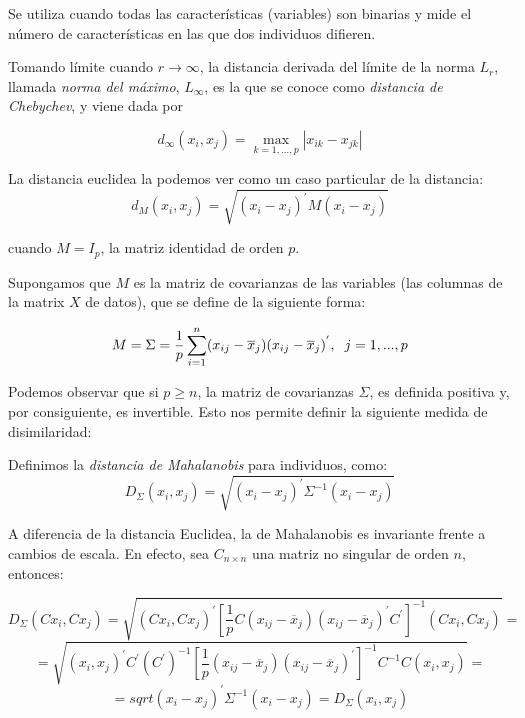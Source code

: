 Se utiliza cuando todas las características (variables) son binarias y mide el número de características en las que dos individuos difieren.

\begin{definicion}  %
    
    Tomando límite cuando $r \rightarrow \infty$, la distancia derivada del límite de la norma $L_{r}$, llamada \textit{norma del máximo}, $L_{\infty}$, es la que se conoce
    como \textit{distancia de Chebychev}, y viene dada por

    \[
    d_{\infty}(x_{i},x_{j}) = \max_{k=1,\dots,p} |x_{ik}-x_{jk}|
    \]
\end{definicion}

\begin{observacion}
    La distancia euclidea la podemos ver como un caso particular de la distancia:
    \[
    d_{M}(x_{i},x_{j}) = \sqrt{(x_{i}-x_{j})^{'}M(x_{i}-x_{j})}
    \]

    cuando $M=I_{p}$, la matriz identidad de orden $p$.
\end{observacion}

Supongamos que $M$ es la matriz de covarianzas de las variables (las columnas de la matrix $X$ de datos), que se define de la siguiente forma:

\[
M=\Sigma = \frac{1}{p} \sum_{i=1}^{n}(x_{ij}-\overline{x}_{j})(x_{ij}-\overline{x}_{j})^{'}, \hspace{0.2cm} j=1,...,p 
\]

Podemos observar que si $p \geq n$, la matriz de covarianzas $\Sigma$, es definida positiva y, por consiguiente, es invertible. Esto nos permite 
definir la siguiente medida de disimilaridad:

\begin{definicion}
    Definimos la \textit{distancia de Mahalanobis} para individuos, como:
    \[
    D_{\Sigma}(x_{i},x_{j}) = \sqrt{(x_{i}-x_{j})^{'}\Sigma^{-1}(x_{i}-x_{j})}
    \]
\end{definicion}

A diferencia de la distancia Euclidea, la de Mahalanobis es invariante frente a cambios de escala. En efecto, sea $C_{n\times n}$ una matriz no singular
de orden $n$, entonces:

\[
D_{\Sigma}(Cx_{i},Cx_{j}) = \sqrt{(Cx_{i},Cx_{j})^{'}[\frac{1}{p}C(x_{ij}-\overline{x}_{j})(x_{ij}-\overline{x}_{j})^{'}C^{'}]^{-1}(Cx_{i},Cx_{j})} = 
\]
\[
= \sqrt{(x_{i},x_{j})^{'}C^{'}(C^{'})^{-1}[\frac{1}{p}(x_{ij}-\overline{x}_{j})(x_{ij}-\overline{x}_{j})^{'}]^{-1}C^{-1}C(x_{i},x_{j})} = 
\]    
\[
= sqrt{(x_{i}-x_{j})^{'}\Sigma^{-1}(x_{i}-x_{j})} = D_{\Sigma}(x_{i},x_{j})
\]

